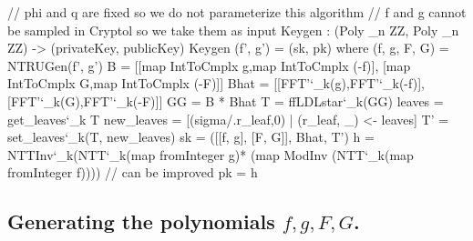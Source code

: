  \begin{algorithm}[!htp]
  \caption{$\keygen(\phi, q)$}\label{alg:keygen}
 \begin{algorithmic}[1]
  \label{alg:keygen:ntru}
  \label{alg:keygen:bgnhatb}
  \State{$\hat \matB \gets \fft(\matB)$} 
  \State{$\matG \gets \hat\matB \times \adj{\hat\matB}$}\label{alg:keygen:endhatb}
  \State{$\tree \gets \ffldl(\matG)$}\label{alg:keygen:bgnftree}
  \label{normal:start}
  \label{normal:end}
  \EndFor
  \State{$\sk \gets (\hat\matB, \tree)$}
  \label{alg:keygen:pk}
  \Return{$\sk, \pk$}
  \end{algorithmic}
 \end{algorithm}

\begin{code}
  // phi and q are fixed so we do not parameterize this algorithm
  // f and g cannot be sampled in Cryptol so we take them as input
  Keygen : (Poly _n ZZ, Poly _n ZZ) -> (privateKey, publicKey)
  Keygen (f', g') = (sk, pk) where
    (f, g, F, G) = NTRUGen(f', g')
    B = [[map IntToCmplx g,map IntToCmplx (-f)],
         [map IntToCmplx G,map IntToCmplx (-F)]]
    Bhat = [[FFT'`{_k}(g),FFT'`{_k}(-f)],
            [FFT'`{_k}(G),FFT'`{_k}(-F)]]
    GG = B * Bhat
    T = ffLDLstar`{_k}(GG)
    leaves = get_leaves`{_k} T
    new_leaves = [(sigma/.r_leaf,0) | (r_leaf, _) <- leaves]
    T' = set_leaves`{_k}(T, new_leaves)
    sk = ([[f, g], [F, G]], Bhat, T')
    h = NTTInv`{_k}(NTT`{_k}(map fromInteger g)*
        (map ModInv (NTT`{_k}(map fromInteger f)))) // can be improved
    pk = h
\end{code}

\subsection{Generating the polynomials \texorpdfstring{$f,g,F,G$}{f, g, F, G}.}\label{sec:spec:keygen:ntrugen}


